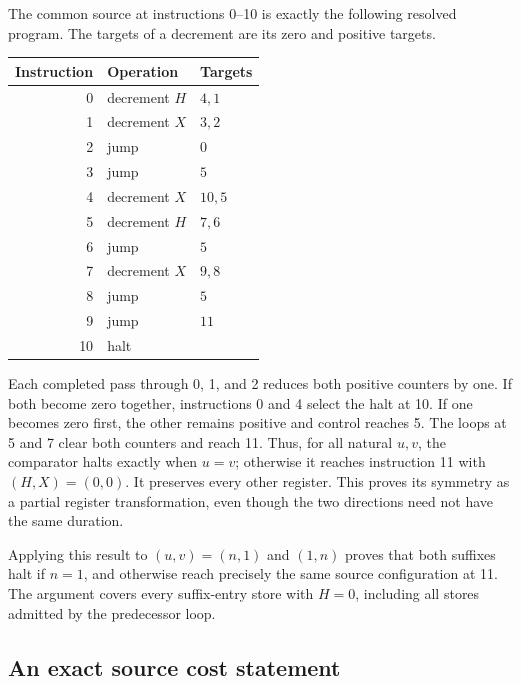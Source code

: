 The common source at instructions 0--10 is exactly the following resolved
program. The targets of a decrement are its zero and positive targets.
\begin{center}
\begin{tabular}{rll}
Instruction&Operation&Targets\\\hline
0&decrement $H$&$4,1$\\
1&decrement $X$&$3,2$\\
2&jump&$0$\\
3&jump&$5$\\
4&decrement $X$&$10,5$\\
5&decrement $H$&$7,6$\\
6&jump&$5$\\
7&decrement $X$&$9,8$\\
8&jump&$5$\\
9&jump&$11$\\
10&halt&\\
\end{tabular}
\end{center}

Each completed pass through 0, 1, and 2 reduces both positive counters by
one. If both become zero together, instructions 0 and 4 select the halt
at 10. If one becomes zero first, the other remains positive and control
reaches 5. The loops at 5 and 7 clear both counters and reach 11. Thus,
for all natural $u,v$, the comparator halts exactly when $u=v$; otherwise
it reaches instruction 11 with $(H,X)=(0,0)$. It preserves every other
register. This proves its symmetry as a partial register transformation,
even though the two directions need not have the same duration.

Applying this result to $(u,v)=(n,1)$ and $(1,n)$ proves that both suffixes
halt if $n=1$, and otherwise reach precisely the same source configuration
at 11. The argument covers every suffix-entry store with $H=0$, including
all stores admitted by the predecessor loop.

\subsection{An exact source cost statement}

